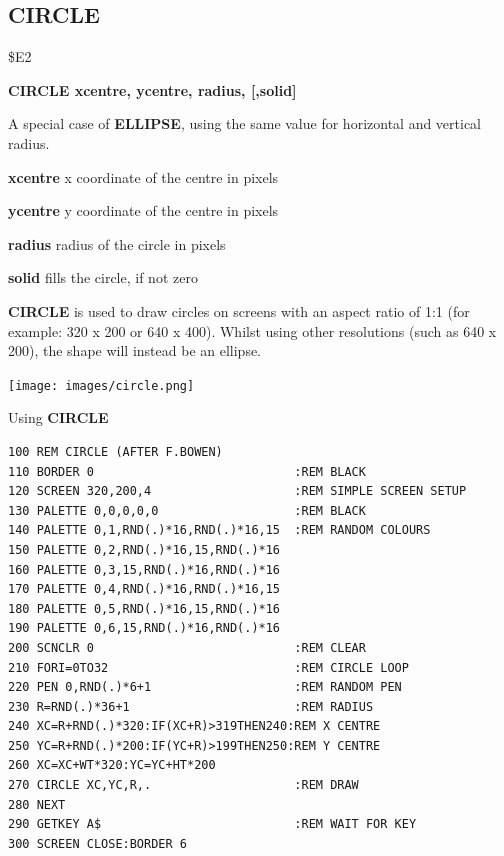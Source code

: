 \subsection{CIRCLE}
\begin{description}[leftmargin=2cm,style=nextline]
\item [Token:] \$E2
\item [Format:] {\bf CIRCLE xcentre, ycentre, radius, [,solid]}
\item [Usage:] A special case of
               {\bf ELLIPSE}, using the same value for
               horizontal and vertical radius.

               {\bf xcentre} x coordinate of the centre in pixels

               {\bf ycentre} y coordinate of the centre in pixels

               {\bf radius} radius of the circle in pixels

               {\bf solid} fills the circle, if not zero

\item [Remarks:] {\bf CIRCLE} is used to draw circles on
               screens with an aspect ratio of 1:1 (for example: 320 x 200
               or 640 x 400). Whilst using other resolutions (such as 640 x 200),
               the shape will instead be an ellipse.

\item \begin{center}\texttt{[image: images/circle.png]}\end{center}
\newpage

\item [Example:] Using {\bf CIRCLE}
\begin{tcolorbox}[colback=black,coltext=white]
\verbatimfont{\codefont}
\begin{verbatim}
100 REM CIRCLE (AFTER F.BOWEN)
110 BORDER 0                            :REM BLACK
120 SCREEN 320,200,4                    :REM SIMPLE SCREEN SETUP
130 PALETTE 0,0,0,0,0                   :REM BLACK
140 PALETTE 0,1,RND(.)*16,RND(.)*16,15  :REM RANDOM COLOURS
150 PALETTE 0,2,RND(.)*16,15,RND(.)*16
160 PALETTE 0,3,15,RND(.)*16,RND(.)*16
170 PALETTE 0,4,RND(.)*16,RND(.)*16,15
180 PALETTE 0,5,RND(.)*16,15,RND(.)*16
190 PALETTE 0,6,15,RND(.)*16,RND(.)*16
200 SCNCLR 0                            :REM CLEAR
210 FORI=0TO32                          :REM CIRCLE LOOP
220 PEN 0,RND(.)*6+1                    :REM RANDOM PEN
230 R=RND(.)*36+1                       :REM RADIUS
240 XC=R+RND(.)*320:IF(XC+R)>319THEN240:REM X CENTRE
250 YC=R+RND(.)*200:IF(YC+R)>199THEN250:REM Y CENTRE
260 XC=XC+WT*320:YC=YC+HT*200
270 CIRCLE XC,YC,R,.                    :REM DRAW
280 NEXT
290 GETKEY A$                           :REM WAIT FOR KEY
300 SCREEN CLOSE:BORDER 6
\end{verbatim}
\end{tcolorbox}
\end{description}

